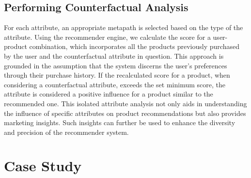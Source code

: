 \subsection{Performing Counterfactual Analysis}
For each attribute, an appropriate metapath is selected based on the type of the
attribute. Using the recommender engine, we calculate the score for a user-product
combination, which incorporates all the products previously purchased by the user
and the counterfactual attribute in question. This approach is grounded in the
assumption that the system discerns the user's preferences through their
purchase history. If the recalculated score for a product, when considering a
counterfactual attribute, exceeds the set minimum score, the attribute is
considered a positive influence for a product similar to the recommended one. This
isolated attribute analysis not only aids in understanding the influence of specific
attributes on product recommendations but also provides marketing insights. Such
insights can further be used to enhance the diversity and precision of the
recommender system.

\section{Case Study}